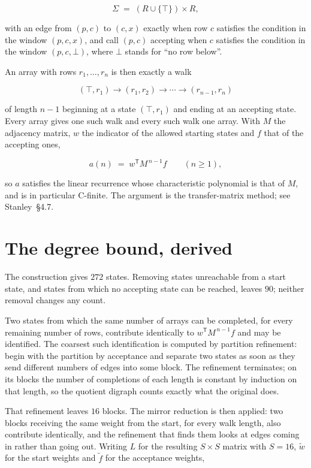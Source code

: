 \documentclass[11pt]{article}
\theoremstyle{definition}
\begin{document}
\[\Sigma \;=\; (R \cup \{\top\}) \times R,\]

with an edge from $(p,c)$ to $(c,x)$ exactly when row $c$ satisfies the condition in the window $(p,c,x)$, and call $(p,c)$ accepting when $c$ satisfies the condition in the window $(p,c,\bot)$, where $\bot$ stands for ``no row below''.

An array with rows $r_1,\dots,r_n$ is then exactly a walk

\[(\top,r_1) \to (r_1,r_2) \to \cdots \to (r_{n-1},r_n)\]

of length $n-1$ beginning at a state $(\top,r_1)$ and ending at an accepting state. Every array gives one such walk and every such walk one array. With $M$ the adjacency matrix, $w$ the indicator of the allowed starting states and $f$ that of the accepting ones,

\[a(n) \;=\; w^{\mathsf T} M^{\,n-1} f \qquad (n \ge 1),\]

so $a$ satisfies the linear recurrence whose characteristic polynomial is that of $M$, and is in particular C-finite. The argument is the transfer-matrix method; see Stanley~\S4.7.

\section{The degree bound, derived}

The construction gives $272$ states. Removing states unreachable from a start state, and states from which no accepting state can be reached, leaves $90$; neither removal changes any count.

Two states from which the same number of arrays can be completed, for every remaining number of rows, contribute identically to $w^{\mathsf T}M^{\,n-1}f$ and may be identified. The coarsest such identification is computed by partition refinement: begin with the partition by acceptance and separate two states as soon as they send different numbers of edges into some block. The refinement terminates; on its blocks the number of completions of each length is constant by induction on that length, so the quotient digraph counts exactly what the original does.

That refinement leaves $16$ blocks. The mirror reduction is then applied: two blocks receiving the same weight from the start, for every walk length, also contribute identically, and the refinement that finds them looks at edges coming in rather than going out. Writing $L$ for the resulting $S \times S$ matrix with $S = 16$, $\tilde w$ for the start weights and $\tilde f$ for the acceptance weights,
\end{document}
